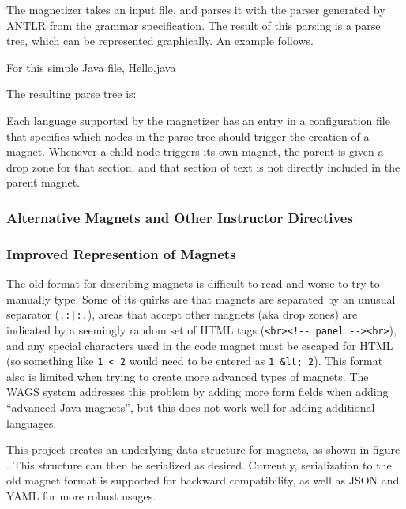 \documentclass[letter,10pt]{article}
\begin{document}
The magnetizer  takes an input 
file, and parses it with the parser generated by ANTLR from the grammar 
specification. The result of this parsing is a parse tree, which can 
be represented graphically. An example follows.

For this simple Java file, Hello.java

The resulting parse tree is:

\label{fig:parseTree}

Each language supported by the magnetizer has an entry in a 
configuration file that specifies which nodes in the parse tree should 
trigger the creation of a magnet. Whenever a child node triggers its 
own magnet, the parent is given a drop zone for that section, and that 
section of text is not directly included in the parent magnet.


\subsubsection{Alternative Magnets and Other Instructor Directives}

\subsubsection{Improved Represention of Magnets}

The old format for describing magnets is difficult to read and worse to 
try to manually type. Some of its quirks are that magnets are separated 
by an unusual separator (\verb~.:|:.~), areas that accept other magnets 
(aka drop zones) are indicated by a seemingly random set of HTML tags 
(\verb~<br><!-- panel --><br>~), and any special characters used in the 
code magnet must be escaped for HTML (so something like \verb~1 < 2~ 
would need to be entered as \verb~1 &lt; 2~). This format also is 
limited when trying to create more advanced types of magnets. The WAGS 
system addresses this problem by adding more form fields when adding 
``advanced Java magnets'', but this does not work well for adding 
additional languages.


This project creates an underlying data structure for magnets, as 
shown in figure . This structure can 
then be serialized as desired. Currently, serialization to the old 
magnet format is supported for backward compatibility, as well as JSON 
and YAML  for more robust usages.
\end{document}
